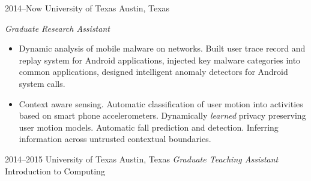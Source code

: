 \documentclass[]{friggeri-cv} %
\begin{document}
\begin{entrylist}


\entry
{2014--Now}
{University of Texas}
{Austin, Texas}
{\emph{Graduate Research Assistant} \\
\begin{itemize}
\item Dynamic analysis of mobile malware on networks. Built user trace record and replay system for Android applications, injected key malware categories into common applications, designed intelligent anomaly detectors for Android system calls.
\item Context aware sensing. Automatic classification of user motion into activities based on smart phone accelerometers. Dynamically \textit{learned} privacy preserving user motion models. Automatic fall prediction and detection. Inferring information across untrusted contextual boundaries. 
\end{itemize} }

\entry
{2014--2015}
{University of Texas}
{Austin, Texas}
{\emph{Graduate Teaching Assistant} \\
Introduction to Computing }



\end{entrylist}
\end{document}
